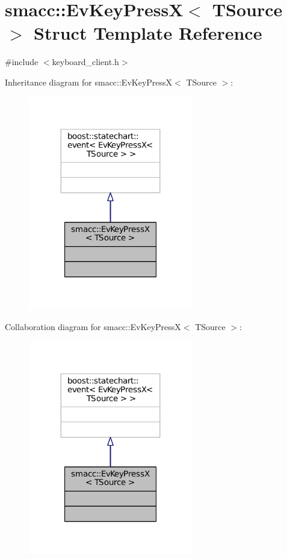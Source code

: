 \hypertarget{structsmacc_1_1EvKeyPressX}{}\section{smacc\+:\+:Ev\+Key\+PressX$<$ T\+Source $>$ Struct Template Reference}
\label{structsmacc_1_1EvKeyPressX}


{\ttfamily \#include $<$keyboard\+\_\+client.\+h$>$}



Inheritance diagram for smacc\+:\+:Ev\+Key\+PressX$<$ T\+Source $>$\+:
\nopagebreak
\begin{figure}[H]
\begin{center}
\leavevmode
\includegraphics[width=203pt]{structsmacc_1_1EvKeyPressX__inherit__graph}
\end{center}
\end{figure}


Collaboration diagram for smacc\+:\+:Ev\+Key\+PressX$<$ T\+Source $>$\+:
\nopagebreak
\begin{figure}[H]
\begin{center}
\leavevmode
\includegraphics[width=203pt]{structsmacc_1_1EvKeyPressX__coll__graph}
\end{center}
\end{figure}


